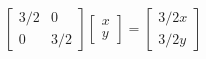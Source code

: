 \documentclass{article}
\begin{document}
\thispagestyle{empty}
$$
\begin{bmatrix}3/2&0\\0&3/2\end{bmatrix}
\begin{bmatrix}x\\y\end{bmatrix} = \begin{bmatrix}3/2x\\3/2y\end{bmatrix}
$$
\end{document}
